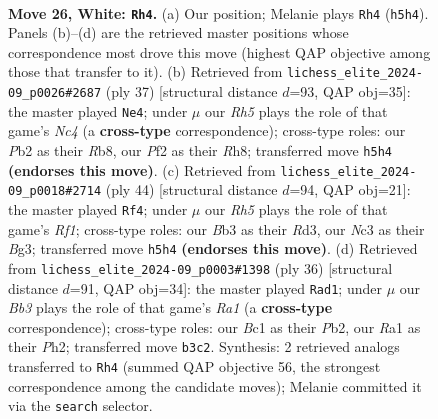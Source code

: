 \documentclass[11pt]{article}
\begin{document}
\clearpage

\begin{figure}[p]\centering
\begin{subfigure}{0.46\textwidth}\centering
\resizebox{\linewidth}{!}{%
\newchessgame
\chessboard[
  setfen={r3kr1b/1ppb4/p2n4/4pp1R/8/PBN2N2/1P2KPP1/R1B5 w - - 3 26},
  showmover=false,
  pgfstyle=straightmove, color=movearrow, markmove={h5-h4}
]}
\caption{}
\end{subfigure}\hfill
\begin{subfigure}{0.46\textwidth}\centering
\resizebox{\linewidth}{!}{%
\newchessgame
\chessboard[
  setfen={1rb4r/2p2k1p/2pb1p2/B1np4/P6P/1P3N2/2P1BPP1/R2K3R b - - 0 19},
  showmover=false,
  pgfstyle=straightmove, color=movearrow, markmove={c5-e4}
]}
\caption{}
\end{subfigure}
\\[4pt]
\begin{subfigure}{0.46\textwidth}\centering
\resizebox{\linewidth}{!}{%
\newchessgame
\chessboard[
  setfen={r3k2r/4bpp1/p1p1pn2/7p/N6P/P2R2B1/1PP3P1/2K2R2 w kq - 2 23},
  showmover=false,
  pgfstyle=straightmove, color=movearrow, markmove={f1-f4}
]}
\caption{}
\end{subfigure}\hfill
\begin{subfigure}{0.46\textwidth}\centering
\resizebox{\linewidth}{!}{%
\newchessgame
\chessboard[
  setfen={r1b2rk1/1p3ppp/p3pn2/4N3/2BR4/P7/1P3PPP/R5K1 w - - 2 19},
  showmover=false,
  pgfstyle=straightmove, color=movearrow, markmove={a1-d1}
]}
\caption{}
\end{subfigure}
\caption{\textbf{Move 26, White: \texttt{Rh4}.} (a) Our position; Melanie plays \texttt{Rh4} (\texttt{h5h4}). Panels (b)--(d) are the retrieved master positions whose correspondence most drove this move (highest QAP objective among those that transfer to it). (b) Retrieved from \texttt{lichess\_elite\_2024-09\_p0026\#2687} (ply 37) [structural distance $d$=93, QAP obj=35]: the master played \texttt{Ne4}; under $\mu$ our \emph{Rh5} plays the role of that game's \emph{Nc4} (a \textbf{cross-type} correspondence); cross-type roles: our \emph{P}b2 as their \emph{R}b8, our \emph{P}f2 as their \emph{R}h8; transferred move \texttt{h5h4} \textbf{(endorses this move)}. (c) Retrieved from \texttt{lichess\_elite\_2024-09\_p0018\#2714} (ply 44) [structural distance $d$=94, QAP obj=21]: the master played \texttt{Rf4}; under $\mu$ our \emph{Rh5} plays the role of that game's \emph{Rf1}; cross-type roles: our \emph{B}b3 as their \emph{R}d3, our \emph{N}c3 as their \emph{B}g3; transferred move \texttt{h5h4} \textbf{(endorses this move)}. (d) Retrieved from \texttt{lichess\_elite\_2024-09\_p0003\#1398} (ply 36) [structural distance $d$=91, QAP obj=34]: the master played \texttt{Rad1}; under $\mu$ our \emph{Bb3} plays the role of that game's \emph{Ra1} (a \textbf{cross-type} correspondence); cross-type roles: our \emph{B}c1 as their \emph{P}b2, our \emph{R}a1 as their \emph{P}h2; transferred move \texttt{b3c2}. Synthesis: 2 retrieved analogs transferred to \texttt{Rh4} (summed QAP objective 56, the strongest correspondence among the candidate moves); Melanie committed it via the \texttt{search} selector.}
\label{fig:thought-m50}
\end{figure}
\end{document}
